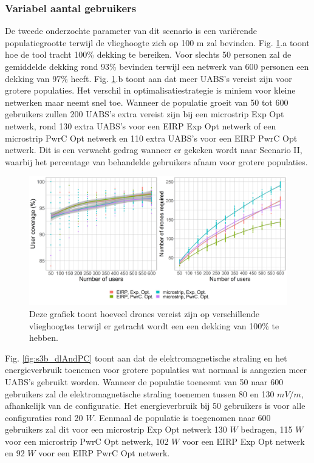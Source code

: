 \documentclass[twocolumn]{phdsymp_dutch}
\begin{document}
\subsubsection{Variabel aantal gebruikers}
De tweede onderzochte parameter van dit scenario is een vari\"erende populatiegrootte
terwijl de vlieghoogte zich op 100 m zal bevinden.
Fig.  \ref{fig:s3b_numdronesAndCov}.a toont hoe de tool tracht 100\% dekking te bereiken.
Voor slechts 50 personen zal de gemiddelde dekking
 rond 93\% bevinden terwijl een netwerk van 600 personen een dekking van 97\% heeft.
Fig. \ref{fig:s3b_numdronesAndCov}.b toont aan dat meer \gls{UABS}'s  vereist zijn voor grotere populaties.
Het verschil in optimalisatiestrategie is miniem voor kleine netwerken maar neemt snel toe. 
Wanneer de populatie groeit van 50 tot 600 gebruikers zullen 200 \gls{UABS}'s extra vereist zijn bij een
 microstrip \gls{Exp Opt} netwerk,
 rond 130 extra \gls{UABS}'s voor een \gls{EIRP} \gls{Exp Opt} netwerk of een microstrip \gls{PwrC Opt} netwerk
 en 110 extra \gls{UABS}'s voor een \gls{EIRP} \gls{PwrC Opt} netwerk.
Dit is een verwacht gedrag wanneer er gekeken wordt naar Scenario II,
waarbij het percentage van behandelde gebruikers afnam voor grotere populaties.



\begin{figure}[h]
  \includegraphics[width=\linewidth]{../results/s3/uvsnumdronesAndCov.png}
  \caption{Deze grafiek toont hoeveel drones vereist zijn op verschillende vlieghoogtes terwijl er getracht wordt een een dekking van 100\% te hebben.}
  \label{fig:s3b_numdronesAndCov}
\end{figure}

Fig. \ref{fig:s3b_dlAndPC} toont aan dat de elektromagnetische straling en het energieverbruik toenemen voor grotere populaties wat normaal is aangezien meer \gls{UABS}'s
gebruikt worden. Wanneer de populatie toeneemt van 50 naar 600 gebruikers zal 
de elektromagnetische straling toenemen tussen 80 en 130 $mV/m$, afhankelijk van de configuratie. 
Het energieverbruik bij 50 gebruikers is voor alle configuraties rond 20 $W$.
Eenmaal de populatie is toegenomen naar 600 gebruikers zal dit voor een
microstrip \gls{Exp Opt} netwerk 130 $W$ bedragen, 115 $W$ voor een microstrip \gls{PwrC Opt} netwerk,
102 $W$ voor een \gls{EIRP} \gls{Exp Opt} netwerk en 92 $W$ voor een  \gls{EIRP} \gls{PwrC Opt} netwerk.
\end{document}
